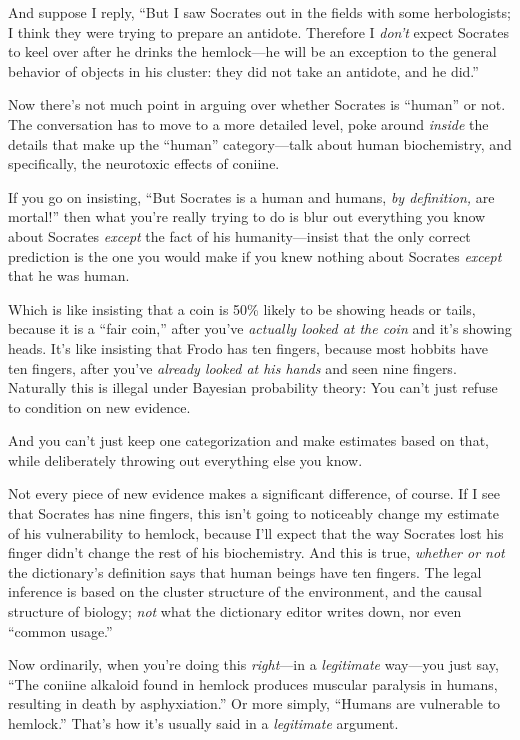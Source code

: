 {
 And suppose I reply, ``But I saw Socrates out in
the fields with some herbologists; I think they were trying to prepare
an antidote. Therefore I \textit{don't} expect Socrates
to keel over after he drinks the hemlock---he will be an exception to
the general behavior of objects in his cluster: they did not take an
antidote, and he did.''}

{
 Now there's not much point in arguing over whether
Socrates is ``human'' or not. The
conversation has to move to a more detailed level, poke around
\textit{inside} the details that make up the
``human'' category---talk about
human biochemistry, and specifically, the neurotoxic effects of
coniine.}

{
 If you go on insisting, ``But Socrates is a human
and humans, \textit{by definition,} are mortal!''
then what you're really trying to do is blur out
everything you know about Socrates \textit{except} the fact of his
humanity---insist that the only correct prediction is the one you would
make if you knew nothing about Socrates \textit{except} that he was
human.}

{
 Which is like insisting that a coin is 50\% likely to be showing
heads or tails, because it is a ``fair
coin,'' after you've \textit{actually
looked at the coin} and it's showing heads.
It's like insisting that Frodo has ten fingers, because
most hobbits have ten fingers, after you've
\textit{already looked at his hands} and seen nine fingers. Naturally
this is illegal under Bayesian probability theory: You
can't just refuse to condition on new evidence.}

{
 And you can't just keep one categorization and
make estimates based on that, while deliberately throwing out
everything else you know.}

{
 Not every piece of new evidence makes a significant difference, of
course. If I see that Socrates has nine fingers, this
isn't going to noticeably change my estimate of his
vulnerability to hemlock, because I'll expect that the
way Socrates lost his finger didn't change the rest of
his biochemistry. And this is true, \textit{whether or not} the
dictionary's definition says that human beings have ten
fingers. The legal inference is based on the cluster structure of the
environment, and the causal structure of biology; \textit{not} what the
dictionary editor writes down, nor even ``common
usage.''}

{
 Now ordinarily, when you're doing this
\textit{right}{}---in a \textit{legitimate} way---you just say,
``The coniine alkaloid found in hemlock produces
muscular paralysis in humans, resulting in death by
asphyxiation.'' Or more simply,
``Humans are vulnerable to
hemlock.'' That's how
it's usually said in a \textit{legitimate} argument.}

